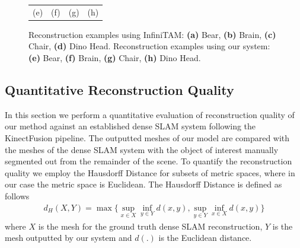 \begin{figure}[!t]
\begin{tabular}{cccc}
		(e)&(f)&(g)&(h) \\ 
	\end{tabular}
	\vspace{1mm}
	\caption{
		Reconstruction examples using InfiniTAM:
		\textbf{(a)} Bear,
		\textbf{(b)} Brain,
		\textbf{(c)} Chair,
		\textbf{(d)} Dino Head.
		Reconstruction examples using our system:
		\textbf{(e)} Bear,
		\textbf{(f)} Brain,
		\textbf{(g)} Chair,
		\textbf{(h)} Dino Head.
	}
	\label{fig:demo}
\end{figure}


\subsection{Quantitative Reconstruction Quality}
In this section we perform a quantitative evaluation of reconstruction quality of our method against an established dense SLAM system \cite{Prisacariu2014} following the KinectFusion \cite{Newcombe2011} pipeline.
The outputted meshes of our model are compared with the meshes of the dense SLAM system with the object of interest manually segmented out from the remainder of the scene. To quantify the reconstruction quality 
we employ the Hausdorff Distance for subsets of metric spaces, where in our case the metric space is Euclidean. The Hausdorff Distance is defined as follows
\begin{equation}
\begin{split}
d_{H}(X, Y) = \max \Bigg \{ \sup_{x \in X} \inf_{y \in Y} d(x, y), \sup_{y \in Y} \inf_{x \in X} d(x, y) \Bigg \}
\end{split}
\end{equation}
where $X$ is the mesh for the ground truth dense SLAM reconstruction, $Y$ is the mesh outputted by our system and $d(.)$ is the Euclidean distance.


